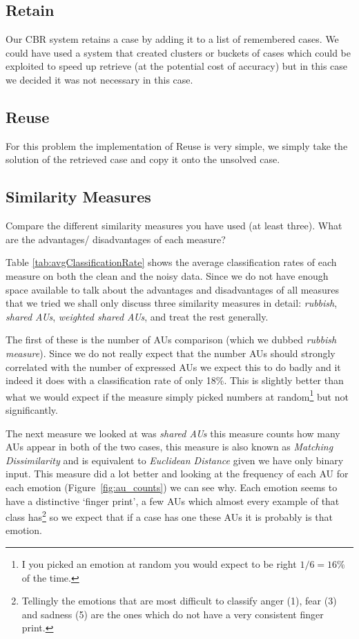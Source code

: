 \documentclass[10pt,a4paper]{article}
\begin{document}
\subsection{Retain}
Our CBR system retains a case by adding it to a list of remembered cases.
We could have used a system that created clusters or buckets of cases which could be exploited to speed up retrieve (at the potential cost of accuracy) but in this case we decided it was not necessary in this case.

\subsection{Reuse}
For this problem the implementation of Reuse is very simple, we simply take the solution of the retrieved case and copy it onto the unsolved case.

\subsection{Similarity Measures}
Compare the different similarity measures you have used (at least three). What are the advantages/ disadvantages of each measure?

Table \ref{tab:avgClassificationRate} shows the average classification rates of each measure on both the clean and the noisy data. 
Since we do not have enough space available to talk about the advantages and disadvantages of all measures that we tried we shall only discuss three similarity measures in detail: \emph{rubbish}, \emph{shared AUs}, \emph{weighted shared AUs}, and treat the rest generally.

The first of these is the number of AUs comparison (which we dubbed \emph{rubbish measure}). Since we do not really expect that the number AUs should strongly correlated with the number of expressed AUs we expect this to do badly and it indeed it does with a classification rate of only 18\%.
This is slightly better than what we would expect if the measure simply picked numbers at random\footnote{I you picked an emotion at random you would expect to be right $1/6 = 16\%$ of the time.} but not significantly.

The next measure we looked at was \emph{shared AUs} this measure counts how many AUs appear in both of the two cases, this measure is also known as \emph{Matching Dissimilarity} and is equivalent to \emph{Euclidean Distance} given we have only binary input. This measure did a lot better and looking at the frequency of each AU for each emotion (Figure~\ref{fig:au_counts}) we can see why. Each emotion seems to have a distinctive `finger print', a few AUs which almost every example of that class has\footnote{Tellingly the emotions that are most difficult to classify anger (1), fear (3) and sadness (5) are the ones which do not have a very consistent finger print.} so we expect that if a case has one these AUs it is probably is that emotion.
\end{document}
